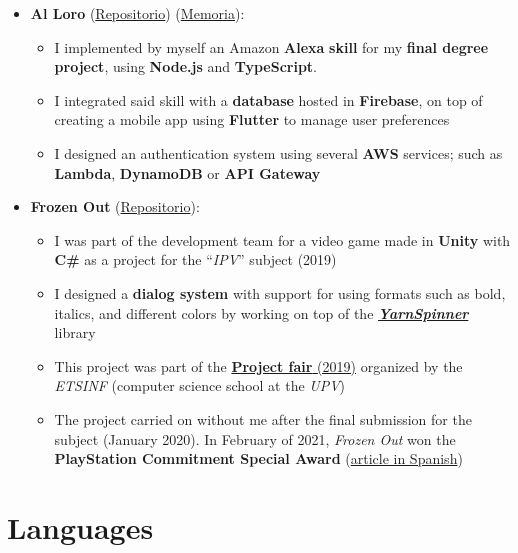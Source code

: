 \documentclass[letterpaper, 12pt, dvipsnames]{article}
\begin{document}
\begin{itemize}
    \item \textbf{Al Loro} (\href{https://github.com/algono/FeedTheParrot-RSS}{Repositorio}) (\href{http://hdl.handle.net/10251/174256}{Memoria}):
          \begin{itemize}
              \item I implemented by myself an Amazon \textbf{Alexa} \textbf{skill} for my \textbf{final degree project}, using \textbf{Node.js} and \textbf{TypeScript}.
              \item I integrated said skill with a \textbf{database} hosted in \textbf{Firebase}, on top of creating a mobile app using \textbf{Flutter} to manage user preferences
              \item I designed an authentication system using several \textbf{AWS} services; such as \textbf{Lambda}, \textbf{DynamoDB} or \textbf{API Gateway}
          \end{itemize}
    \item \textbf{Frozen Out} (\href{https://github.com/Freezer-Games/Frozen-Out}{Repositorio}):
          \begin{itemize}
              \item I was part of the development team for a video game made in \textbf{Unity} with \textbf{C\#} as a project for the ``\emph{IPV}'' subject (2019)
              \item I designed a \textbf{dialog system} with support for using formats such as bold, italics, and different colors by working on top of the \href{https://yarnspinner.dev/}{\textbf{\emph{YarnSpinner}}} library
              \item This project was part of the \href{https://es-es.facebook.com/etsinf/videos/feria-de-proyectos-de-estudiantes-2019/1921312964681641/}{\textbf{Project fair} (2019)} organized by the \emph{ETSINF} (computer science school at the \emph{UPV})
              \item The project carried on without me after the final submission for the subject (January 2020). In February of 2021, \emph{Frozen Out} won the \textbf{PlayStation Commitment Special Award} (\href{https://www.inf.upv.es/www/etsinf/es/premio-especial-compromiso-playstation-para-el-videojuego-frozen-out-creado-por-estudiantes-de-la-etsinf-y-la-facultat-de-bb-aa/}{article in Spanish})
          \end{itemize}
\end{itemize}

\section*{Languages}
\end{document}
